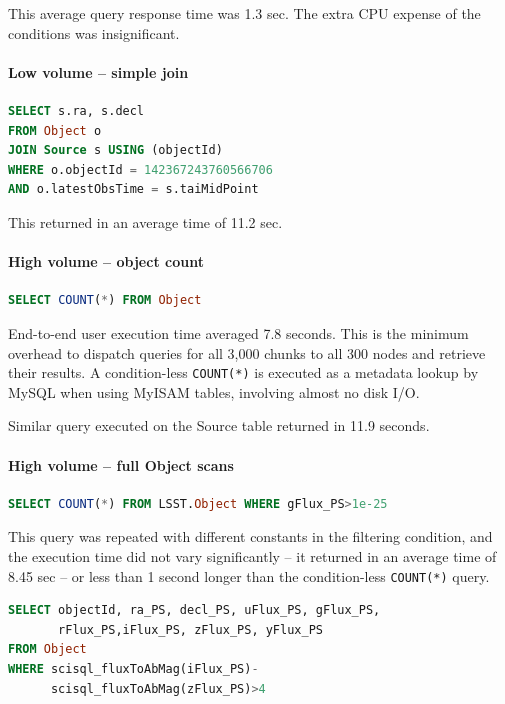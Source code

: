 \documentclass[DM,lsstdraft,toc]{lsstdoc}
\begin{document}
This average query response time was 1.3 sec. The extra CPU expense of
the conditions was insignificant.

\paragraph{Low volume -- simple join}\label{low-volume-simple-join}

\begin{lstlisting}[language=SQL]
SELECT s.ra, s.decl
FROM Object o
JOIN Source s USING (objectId)
WHERE o.objectId = 142367243760566706
AND o.latestObsTime = s.taiMidPoint
\end{lstlisting}

This returned in an average time of 11.2 sec.

\paragraph{High volume -- object count}\label{high-volume-object-count}

\begin{lstlisting}[language=SQL]
SELECT COUNT(*) FROM Object
\end{lstlisting}

End-to-end user execution time averaged 7.8 seconds. This is the minimum
overhead to dispatch queries for all 3,000 chunks to all 300 nodes and
retrieve their results. A condition-less \texttt{COUNT(*)} is executed
as a metadata lookup by MySQL when using MyISAM tables, involving almost
no disk I/O.

Similar query executed on the Source table returned in 11.9 seconds.

\paragraph{High volume -- full Object
scans}\label{high-volume-full-object-scans}

\begin{lstlisting}[language=SQL]
SELECT COUNT(*) FROM LSST.Object WHERE gFlux_PS>1e-25
\end{lstlisting}

This query was repeated with different constants in the filtering
condition, and the execution time did not vary significantly -- it
returned in an average time of 8.45 sec -- or less than 1 second longer
than the condition-less \texttt{COUNT(*)} query.

\begin{lstlisting}[language=SQL]
SELECT objectId, ra_PS, decl_PS, uFlux_PS, gFlux_PS,
       rFlux_PS,iFlux_PS, zFlux_PS, yFlux_PS
FROM Object
WHERE scisql_fluxToAbMag(iFlux_PS)-
      scisql_fluxToAbMag(zFlux_PS)>4
\end{lstlisting}
\end{document}
